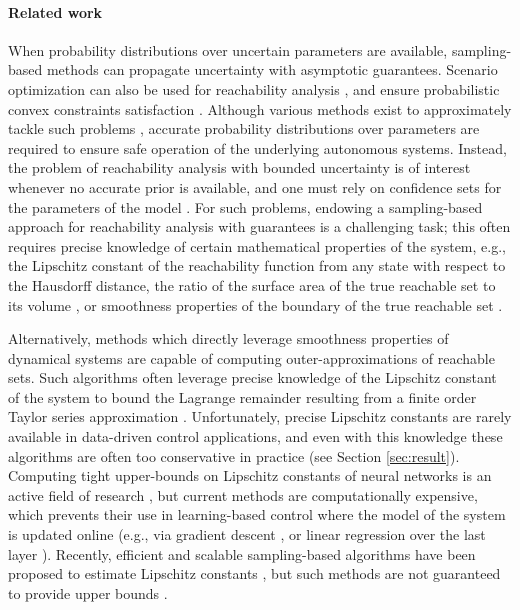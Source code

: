 \documentclass{article}
\begin{document}
\vspace{-2mm}\paragraph{Related work} When probability distributions over uncertain parameters are available, sampling-based methods can propagate uncertainty \citep{SchmerlingPavone2017,LoquercioRAL2020} with asymptotic guarantees. Scenario optimization can also be used for reachability analysis \citep{EstReachSets_L4DC20}, and ensure probabilistic convex constraints satisfaction \citep{EsfahaniScenario2015}. Although various methods exist to approximately tackle such problems \citep{hewing2018cautious,LewBonalli2020,CastilloRAL2020,BerretAutomatica2020}, accurate probability distributions over parameters are required to ensure safe operation of the underlying autonomous systems. Instead, the problem of reachability analysis with bounded uncertainty is of interest whenever no accurate prior is available, and one must rely on confidence sets for the  parameters of the model \citep{abbasi2011improved}. For such problems, endowing a sampling-based approach for reachability analysis with guarantees is a challenging task; this often requires precise knowledge of certain mathematical properties of the system, e.g., the Lipschitz constant of the reachability function from any state with respect to the Hausdorff distance, the ratio of the surface area of the true reachable set to its volume \citep{LiebenweinRSS2018}, or smoothness properties of the boundary of the true reachable set \citep{Kor1993_BookMinimaxImgReconstr}. 

Alternatively, methods which directly leverage smoothness properties of dynamical systems are capable of computing outer-approximations of reachable sets. 
Such algorithms often leverage precise knowledge of the Lipschitz constant of the system to bound the Lagrange remainder resulting from a finite order Taylor series approximation \citep{koller2018,Dean2019RobustGF}. 
Unfortunately, precise Lipschitz constants are rarely available in data-driven control applications, and even with this knowledge these algorithms are often too conservative in practice (see Section \ref{sec:result}).
Computing tight upper-bounds on Lipschitz constants of neural networks is an active field of research \citep{fazlyab2019efficient,lipsPoly2020}, but current methods are computationally expensive, %
which prevents their use in learning-based control where the model of the system is updated online (e.g., via gradient descent \citep{MAML2017}, or linear regression over the last layer \citep{HarrisonSharmaEtAl2018,LewSharmaHarrisonPavone2020}). 
Recently, efficient and scalable sampling-based algorithms have been proposed to estimate Lipschitz constants  \citep{Dean2019RobustGF,WengExtreme2018}, but such  methods are not guaranteed to provide upper bounds \citep{fazlyab2019efficient}.
\end{document}
